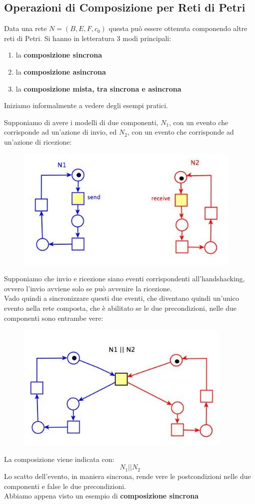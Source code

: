 \documentclass[a4paper,12pt, oneside]{book}
\begin{document}
\subsection{Operazioni di Composizione per Reti di Petri}
Data una rete $N=(B,E,F,c_0)$ questa può essere ottenuta componendo altre reti
di Petri. Si hanno in letteratura 3 modi principali:
\begin{enumerate}
  \item la \textbf{composizione sincrona}
  \item la \textbf{composizione asincrona}
  \item la \textbf{composizione mista, tra sincrona e asincrona}
\end{enumerate}
\newpage
Iniziamo informalmente a vedere degli esempi pratici.
\begin{esempio}
  Supponiamo di avere i modelli di due componenti, $N_1$, con un evento che
  corrisponde ad un'azione di invio, ed $N_2$, con un evento che corrisponde ad
  un'azione di ricezione:
  \begin{figure}[H]
    \centering
    \includegraphics[scale = 0.5]{img/sinc.jpg} 
  \end{figure}
  Supponiamo che invio e ricezione siano eventi corrispondenti all'handshacking,
  ovvero l'invio avviene solo se può avvenire la ricezione.\\
  Vado quindi a sincronizzare questi due eventi, che diventano quindi un'unico
  evento nella rete composta, che è abilitato se le due precondizioni, nelle due
  componenti sono entrambe vere: 
  \begin{figure}[H]
    \centering
    \includegraphics[scale = 0.5]{img/sinc2.jpg} 
  \end{figure}
  La composizione viene indicata con:
  \[N_1||N_2\]
  Lo scatto dell'evento, in maniera sincrona, rende vere le postcondizioni nelle
  due componenti e false le due precondizioni.\\
  Abbiamo appena visto un esempio di \textbf{composizione sincrona}
\end{esempio}
\end{document}
